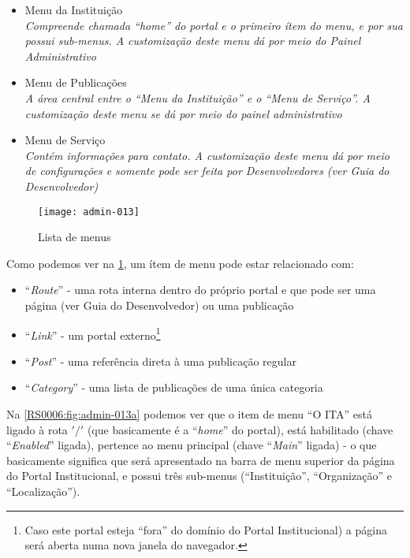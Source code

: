 \begin{itemize}
    \item Menu da Instituição\\
        \textit{Compreende chamada ``home'' do portal e o primeiro ítem do menu, e por sua possui sub-menus. A customização deste menu dá por meio do Painel Administrativo}
    \item Menu de Publicações\\
        \textit{A área central entre o ``Menu da Instituição'' e o ``Menu de Serviço''. A customização deste menu se dá por meio do painel administrativo}
    \item Menu de Serviço\\
    \textit{Contém informações para contato. A customização deste menu dá por meio de configurações e somente pode ser feita por Desenvolvedores (ver Guia do Desenvolvedor)}
\end{itemize}

\begin{figure}[!ht]
    \centering
    \texttt{[image: admin-013]}
    \caption{Lista de menus}\label{RS0006:fig:admin-013}
\end{figure}

Como podemos ver na \cref{RS0006:fig:admin-013}, um ítem de menu pode estar relacionado com:

\begin{itemize}
    \item ``\textit{Route}'' - uma rota interna dentro do próprio portal e que pode ser uma página (ver Guia do Desenvolvedor) ou uma publicação
    \item ``\textit{Link}'' - um portal externo\footnote{Caso este portal esteja ``fora'' do domínio do Portal Institucional) a página será aberta numa nova janela do navegador.}
    \item ``\textit{Post}'' - uma referência direta à uma publicação regular
    \item ``\textit{Category}'' - uma lista de publicações de uma única categoria
\end{itemize}

Na \cref{RS0006:fig:admin-013a} podemos ver que o item de menu ``O ITA'' está ligado à rota $'/'$ (que basicamente é a ``\textit{home}'' do portal), está habilitado (chave ``\textit{Enabled}'' ligada), pertence ao menu principal (chave ``\textit{Main}'' ligada) - o que basicamente significa que será apresentado na barra de menu superior da página do Portal Institucional, e possui três sub-menus (``Instituição'', ``Organização'' e ``Localização'').

